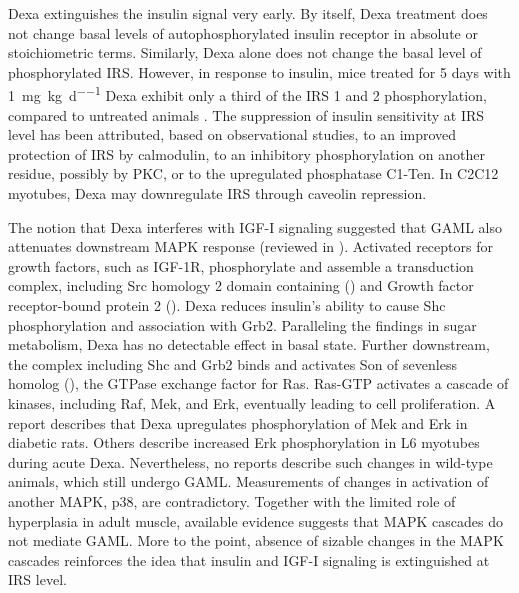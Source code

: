 \documentclass[12pt,english]{report}\usepackage[]{graphicx}\usepackage[]{color}
\begin{document}
Dexa extinguishes the insulin signal very early. By itself, Dexa treatment
does not change basal levels of autophosphorylated insulin receptor
in absolute or stoichiometric terms\citep{saad1993modulation,corporeau2006adipose,ishizuka1995effect}.
Similarly, Dexa alone does not change the basal level of phosphorylated
IRS. However, in response to insulin, mice treated for 5 days with
\SI{1}{\milli\gram\per\kilo\gram\per\day} Dexa exhibit only a third
of the IRS 1 and 2 phosphorylation, compared to untreated animals
\citep{rojas2003regulation}. The suppression of insulin sensitivity
at IRS level has been attributed, based on observational studies,
to an improved protection of IRS by calmodulin\citep{li2000binding},
to an inhibitory phosphorylation on another residue, possibly by PKC\citep{morgan200911beta-hydroxysteroid,ishizuka1995effect},
or to the upregulated phosphatase C1-Ten\citep{koh2013c1-ten}. In
C2C12 myotubes, Dexa may downregulate IRS through caveolin repression\citep{son2015dexamethasone}.

The notion that Dexa interferes with IGF-I signaling suggested that
GAML also attenuates downstream MAPK response (reviewed in \citep{mendoza2011ras-erk}).
Activated receptors for growth factors, such as IGF-1R, phosphorylate
and assemble a transduction complex, including Src homology 2 domain
containing ()
and Growth factor receptor-bound protein 2 ().
Dexa reduces insulin's ability to cause Shc phosphorylation and association
with Grb2\citep{paez-espinosa1999insulin-induced}. Paralleling the
findings in sugar metabolism, Dexa has no detectable effect in basal
state. Further downstream, the complex including Shc and Grb2 binds
and activates Son of sevenless homolog (),
the GTPase exchange factor for Ras. Ras-GTP activates a cascade of
kinases, including Raf, Mek, and Erk, eventually leading to cell proliferation.
A report describes that Dexa upregulates phosphorylation of Mek and
Erk in diabetic rats\citep{zheng2010foxo3a}. Others describe increased
Erk phosphorylation in L6 myotubes during acute Dexa\citep{giron2015beta-hydroxy-beta-methylbutyrate}.
Nevertheless, no reports describe such changes in wild-type animals,
which still undergo GAML. Measurements of changes in activation of
another MAPK, p38, are contradictory\citep{qin2010protection,mcclung2010p38}.
Together with the limited role of hyperplasia in adult muscle, available
evidence suggests that MAPK cascades do not mediate GAML. More to
the point, absence of sizable changes in the MAPK cascades reinforces
the idea that insulin and IGF-I signaling is extinguished at IRS level.
\end{document}
